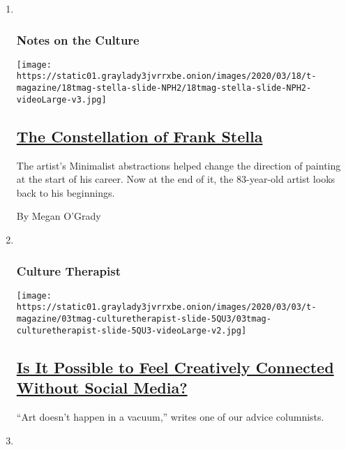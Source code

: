 \begin{enumerate}
\def\labelenumi{\arabic{enumi}.}
\item ~
  \hypertarget{notes-on-the-culture}{%
  \subsubsection{Notes on the Culture}\label{notes-on-the-culture}}

  \texttt{[image: https://static01.graylady3jvrrxbe.onion/images/2020/03/18/t-magazine/18tmag-stella-slide-NPH2/18tmag-stella-slide-NPH2-videoLarge-v3.jpg]}

  \hypertarget{the-constellation-of-frank-stella}{%
  \subsection{\texorpdfstring{\href{/2020/03/18/t-magazine/frank-stella.html}{The
  Constellation of Frank
  Stella}}{The Constellation of Frank Stella}}\label{the-constellation-of-frank-stella}}

  The artist's Minimalist abstractions helped change the direction of
  painting at the start of his career. Now at the end of it, the
  83-year-old artist looks back to his beginnings.

  By Megan O'Grady
\item ~
  \hypertarget{culture-therapist}{%
  \subsubsection{Culture Therapist}\label{culture-therapist}}

  \texttt{[image: https://static01.graylady3jvrrxbe.onion/images/2020/03/03/t-magazine/03tmag-culturetherapist-slide-5QU3/03tmag-culturetherapist-slide-5QU3-videoLarge-v2.jpg]}

  \hypertarget{is-it-possible-to-feel-creatively-connected-without-social-media}{%
  \subsection{\texorpdfstring{\href{/2020/03/04/t-magazine/artists-creativity-social-media.html}{Is
  It Possible to Feel Creatively Connected Without Social
  Media?}}{Is It Possible to Feel Creatively Connected Without Social Media?}}\label{is-it-possible-to-feel-creatively-connected-without-social-media}}

  ``Art doesn't happen in a vacuum,'' writes one of our advice
  columnists.
\item ~
  \hypertarget{arts-and-letters}{%
}
\end{enumerate}
